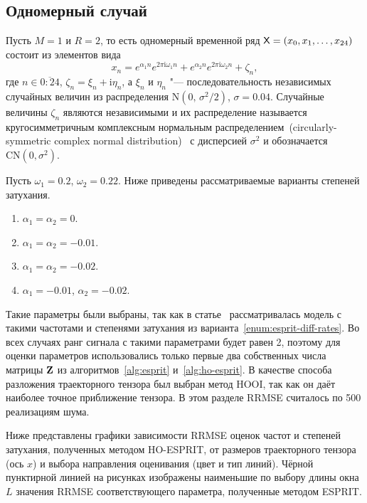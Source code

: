 \documentclass[specialist,
  substylefile=spbu_report.rtx,
subf,href,colorlinks=true, 12pt]{disser}
\theoremstyle{plain}
\theoremstyle{definition}
\theoremstyle{remark}
\newcommand{\iu}{\mathrm{i}}
\begin{document}
\subsection{Одномерный случай}\label{subsec:esprit-comparison}
Пусть $M=1$ и $R=2$, то есть одномерный временной ряд $\mathsf{X} =
\left(x_0, x_1, \ldots, x_{24}\right)$
состоит из элементов вида
\begin{equation}\label{eq:esprit-1d-series}
  x_n = e^{ \alpha_1 n }
  e^{2 \pi\iu \omega_1 n} +
  e^{ \alpha_2 n }
  e^{ 2 \pi \iu \omega_2 n} + \zeta_n,
\end{equation}
где $n \in \overline{0:24}$, $\zeta_n = \xi_n + \iu \eta_n$, а
$\xi_n$ и $\eta_n$ "--- последовательность независимых случайных величин из
распределения $\mathrm{N}(0,\, \sigma^2 / 2)$, $\sigma=0.04$.
Случайные величины $\zeta_n$ являются независимыми и их
распределение называется кругосимметричным комплексным нормальным
распределением~(circularly-symmetric complex normal
distribution)~\cite{ComplexNormal} с дисперсией
$\sigma^2$ и обозначается
$\mathrm{CN}(0, \sigma^2)$.

Пусть $\omega_1 = 0.2$, $\omega_2 = 0.22$.
Ниже приведены рассматриваемые варианты степеней затухания.
\begin{enumerate}
  \item\label{enum:esprit-no-rates} $\alpha_1=\alpha_2=0$.
  \item\label{enum:esprit-smalleq-rates} $\alpha_1=\alpha_2=-0.01$.
  \item\label{enum:esprit-bigeq-rates} $\alpha_1=\alpha_2=-0.02$.
  \item\label{enum:esprit-diff-rates} $\alpha_1= -0.01$, $\alpha_2=-0.02$.
\end{enumerate}
Такие параметры были выбраны, так как в статье~\cite{hosvd-hooi-separation}
рассматривалась модель с такими частотами и степенями затухания из
варианта~\ref{enum:esprit-diff-rates}.
Во всех случаях ранг сигнала с такими параметрами будет равен 2,
поэтому для оценки параметров
использовались только первые два собственных числа матрицы $\mathbf{Z}$ из
алгоритмов~\ref{alg:esprit}
и~\ref{alg:ho-esprit}.
В качестве способа разложения траекторного тензора был выбран
метод HOOI, так как он даёт наиболее точное приближение
тензора.
В этом разделе RRMSE считалось по 500 реализациям шума.

Ниже представлены графики зависимости RRMSE оценок частот и
степеней затухания,
полученных методом HO-ESPRIT, от размеров траекторного тензора
(ось $x$) и выбора направления оценивания (цвет и тип линий).
Чёрной пунктирной линией на рисунках изображены наименьшие по выбору
длины окна $L$ значения RRMSE
соответствующего параметра, полученные методом ESPRIT.
\end{document}
